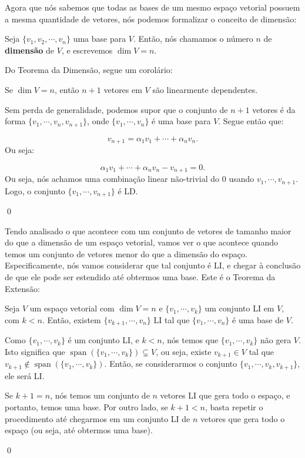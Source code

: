 Agora que nós sabemos que todas as bases de um mesmo espaço vetorial possuem a mesma quantidade de vetores, nós podemos formalizar o conceito de dimensão:

\begin{Definition}
	Seja $\{v_1, v_2, \cdots, v_n\}$ uma base para $V$. Então, nós chamamos o número $n$ de \textbf{dimensão} de $V$, e escrevemos $\dim V = n$.
\end{Definition}

Do Teorema da Dimensão, segue um corolário:

\begin{Corolary}
	Se $\dim V = n$, então $n + 1$ vetores em $V$ são linearmente dependentes.
\end{Corolary}

\begin{Proof}
	Sem perda de generalidade, podemos supor que o conjunto de $n + 1$ vetores é da forma $\{v_1, \cdots, v_n, v_{n + 1}\}$, onde $\{v_1, \cdots, v_n\}$ é uma base para $V$. Segue então que:
	
	$$
	v_{n + 1} = \alpha_1v_1 + \cdots + \alpha_nv_n.
	$$
	Ou seja:
	
	$$
	\alpha_1v_1 + \cdots + \alpha_nv_n - v_{n + 1} = 0.
	$$
	Ou seja, nós achamos uma combinação linear não-trivial do $0$ usando $v_1, \cdots, v_{n + 1}$. Logo, o conjunto $\{v_1, \cdots, v_{n + 1}\}$ é LD.
	
	\qed
\end{Proof}

Tendo analisado o que acontece com um conjunto de vetores de tamanho maior do que a dimensão de um espaço vetorial, vamos ver o que acontece quando temos um conjunto de vetores menor do que a dimensão do espaço. Especificamente, nós vamos considerar que tal conjunto é LI, e chegar à conclusão de que ele pode ser estendido até obtermos uma base. Este é o Teorema da Extensão:

\begin{Theorem}
	Seja $V$ um espaço vetorial com $\dim V = n$ e $\{v_1, \cdots, v_k\}$ um conjunto LI em $V$, com $k < n$. Então, existem $\{v_{k + 1}, \cdots, v_n\}$ LI tal que $\{v_1, \cdots, v_n\}$ é uma base de $V$.
\end{Theorem}

\begin{Proof}
	Como $\{v_1, \cdots, v_k\}$ é um conjunto LI, e $k < n$, nós temos que $\{v_1, \cdots, v_k\}$ não gera $V$. Isto significa que $\operatorname{span}(\{v_1, \cdots, v_k\})\subsetneq V$, ou seja, existe $v_{k + 1}\in V$ tal que $v_{k + 1}\notin\operatorname{span}(\{v_1, \cdots, v_k\})$. Então, se considerarmos o conjunto $\{v_1, \cdots, v_k, v_{k + 1}\}$, ele será LI. 
	
	Se $k + 1 = n$, nós temos um conjunto de $n$ vetores LI que gera todo o espaço, e portanto, temos uma base. Por outro lado, se $k + 1 < n$, basta repetir o procedimento até chegarmos em um conjunto LI de $n$ vetores que gera todo o espaço (ou seja, até obtermos uma base).
	
	\qed
\end{Proof}

